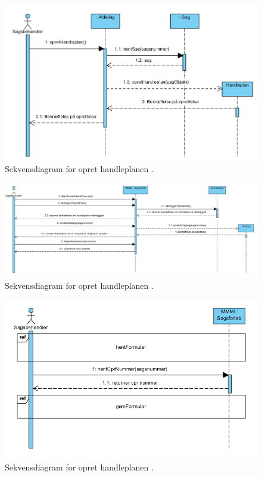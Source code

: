 \begin{figure}[hbt!]
  \includegraphics[width=\linewidth]{./PNG/sekDiaOpretHandleplan.PNG} 
  \caption{Sekvensdiagram for opret handleplanen .}
  \label{fig:OpretPlan}
\end{figure}
\newpage
\begin{figure}[hbt!]
  \includegraphics[width=\linewidth]{./PNG/sekDiaSagsforloebAfgoere.PNG} 
  \caption{Sekvensdiagram for opret handleplanen .}
  \label{fig:SagforAf}
\end{figure}
\newpage
\begin{figure}[hbt!]
  \includegraphics[width=\linewidth]{./PNG/sekDiaSagsforloebIndhent.PNG} 
  \caption{Sekvensdiagram for opret handleplanen .}
  \label{fig:SagforInd}
\end{figure}
